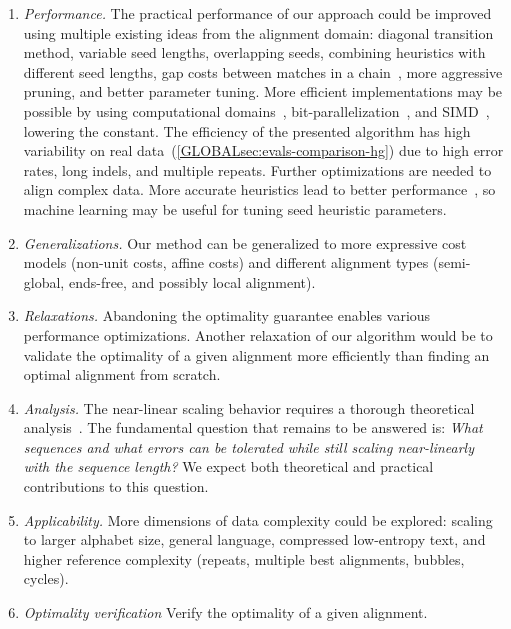 \begin{enumerate}
    \item \emph{Performance.} The practical performance of our \A approach could
        be improved using multiple existing ideas from the alignment domain:
        diagonal transition method, variable seed lengths, overlapping seeds,
        combining heuristics with different seed lengths, gap costs between
        matches in a chain~\citep{ukkonen1985algorithms,wilbur1984context}, more
        aggressive pruning, and better parameter tuning. More efficient
        implementations may be possible by using computational
        domains~\citep{spouge1989speeding},
        bit-parallelization~\citep{myers1999fast}, and
        SIMD~\citep{marco2021fast}, lowering the \A constant. The efficiency of
        the presented algorithm has high variability on real
        data~(\cref{GLOBALsec:evals-comparison-hg}) due to high error rates,
        long indels, and multiple repeats. Further optimizations are needed to
        align complex data. More accurate heuristics lead to better \A
        performance~\cite{pearl_discovery_1983}, so machine learning may be
        useful for tuning seed heuristic parameters.
    \item \emph{Generalizations.} Our method can be generalized to more
        expressive cost models (non-unit costs, affine costs) and different alignment
        types (semi-global, ends-free, and possibly local alignment).
    \item \emph{Relaxations.} Abandoning the optimality guarantee
        enables various performance optimizations. Another relaxation
        of our algorithm would be to validate the optimality of a given alignment more
        efficiently than finding an optimal alignment from scratch.
    \item \emph{Analysis.} The near-linear scaling behavior requires a thorough
        theoretical analysis~\citep{medvedev2022limitations}. The fundamental
        question that remains to be answered is: \emph{What sequences and what
        errors can be tolerated while still scaling near-linearly with the
        sequence length?} We expect both theoretical and practical contributions
        to this question.
    \item \emph{Applicability.} More dimensions of data complexity could be
        explored: scaling to larger alphabet size, general language, compressed
        low-entropy text, and higher reference complexity (repeats, multiple best
        alignments, bubbles, cycles).
    \item \emph{Optimality verification} Verify the optimality of a given alignment.
\end{enumerate}

